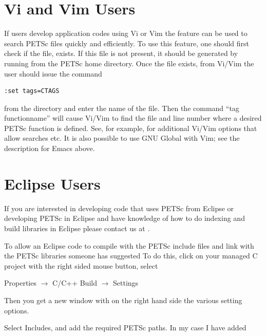 {{\section{Vi and Vim Users}   

If users develop application codes  using Vi or Vim the  feature can be used to search PETSc
files quickly and efficiently.  To use this feature, one should
first check if the file,
 exists.  If this file is
not present, it should be generated by
running   from the PETSc home directory.
Once the file exists, from
Vi/Vim the user should issue
the command
\begin{lstlisting}
:set tags=CTAGS
\end{lstlisting}
from the  directory and enter the
name of the  file. Then the command ``tag functionname'' will cause Vi/Vim
to find the file and line number where a desired PETSc function
is defined.  See, for example, \href{http://www.yolinux.com/TUTORIALS/LinuxTutorialAdvanced_vi.html}{} for additional Vi/Vim options that allow searches etc.
It is also possible to use GNU Global with Vim; see the description for Emacs above.

\section{Eclipse Users} 
If you are interested in developing code that uses PETSc from Eclipse or developing PETSc in Eclipse and have knowledge of how to do indexing and build libraries in Eclipse please contact us at \href{mailto:petsc-dev@mcs.anl.gov}{}.

To allow an Eclipse code to compile with the PETSc include files and link with the PETSc libraries someone has suggested
To do this, click on your managed C project with the right sided mouse button, select

Properties $\rightarrow$ C/C++ Build $\rightarrow$ Settings

Then you get a new window with on the right hand side the various setting options.

Select Includes, and add the required PETSc paths. In my case I have added

}}
